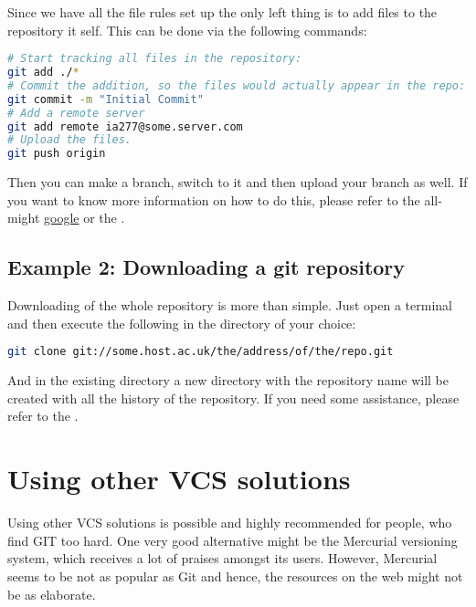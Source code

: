 \documentclass[
]{scrartcl}
\begin{document}
%
Since we have all the file rules set up the only left thing is to add files to
    the repository it self.
%
This can be done via the following commands:
%
\begin{lstlisting}[language=Bash]
# Start tracking all files in the repository:
git add ./*
# Commit the addition, so the files would actually appear in the repo:
git commit -m "Initial Commit"
# Add a remote server
git add remote ia277@some.server.com
# Upload the files.
git push origin
\end{lstlisting}
%
Then you can make a branch, switch to it and then upload your branch as well.
%
If you want to know more information on how to do this, please refer to the
    all-might \href{http://www.google.co.uk}{google} or the
    .

%
\subsection{Example 2: Downloading a git repository}

%
Downloading of the whole repository is more than simple.
%
Just open a terminal and then execute the following in the directory of your
    choice:
%
\begin{lstlisting}[language=Bash]
git clone git://some.host.ac.uk/the/address/of/the/repo.git
\end{lstlisting}

%
And in the existing directory a new directory with the repository name will be
    created with all the history of the repository.
%
If you need some assistance, please refer to the
    .

%

\section{Using other VCS solutions}

Using other VCS solutions is possible and highly recommended for people, who
find GIT too hard. 
%
One very good alternative might be the Mercurial versioning system, which
receives a lot of praises amongst its users.
%
However, Mercurial seems to be not as popular as Git and hence, the resources on
the web might not be as elaborate.
\end{document}
